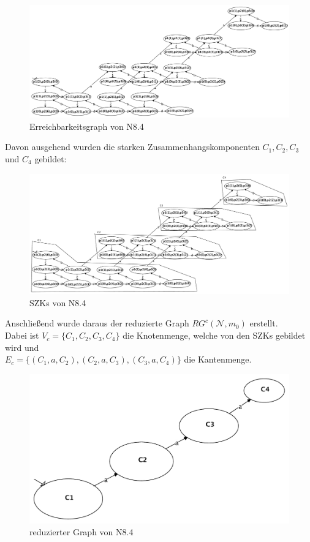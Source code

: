 \documentclass[12pt, paper=a4]{article}
\begin{document}
\begin{figure}[h!]
	\centering
	\includegraphics[scale=0.35]{8_4errg.pdf}
	\caption{Erreichbarkeitsgraph von N8.4}
\end{figure}

Davon ausgehend wurden die starken Zusammenhangskomponenten \( C_1, C_2, C_3 \) und \( C_4 \) gebildet:

\begin{figure}[h!]
	\centering
	\includegraphics[scale=0.35]{8_4SZK.pdf}
	\caption{SZKs von N8.4}
\end{figure}

Anschließend wurde daraus der reduzierte Graph \(RG^c(\mathcal{N},m_0)\) erstellt.\\
Dabei ist \(V_c = \{C_1,C_2,C_3,C_4\}\) die Knotenmenge, welche von den SZKs gebildet wird und\\
\(E_c = \{(C_1,a,C_2), (C_2,a,C_3), (C_3,a,C_4)\}\) die Kantenmenge.

\begin{figure}[h!]
	\centering
	\includegraphics[scale=0.4]{8_4RGc.pdf}
	\caption{reduzierter Graph von N8.4}
\end{figure}
\end{document}
